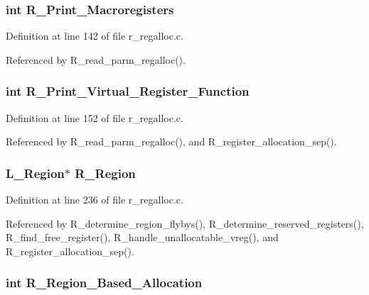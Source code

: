 \subsubsection{\setlength{\rightskip}{0pt plus 5cm}int \bf{R\_\-Print\_\-Macroregisters}}\label{r__regalloc_8h_e5a9cb5c06f2fc4697e6af7cf304277c}




Definition at line 142 of file r\_\-regalloc.c.

Referenced by R\_\-read\_\-parm\_\-regalloc().
\subsubsection{\setlength{\rightskip}{0pt plus 5cm}int \bf{R\_\-Print\_\-Virtual\_\-Register\_\-Function}}\label{r__regalloc_8h_9ae8198dd0b4a1782a84ca9b533a1b66}




Definition at line 152 of file r\_\-regalloc.c.

Referenced by R\_\-read\_\-parm\_\-regalloc(), and R\_\-register\_\-allocation\_\-sep().
\subsubsection{\setlength{\rightskip}{0pt plus 5cm}L\_\-Region$\ast$ \bf{R\_\-Region}}\label{r__regalloc_8h_8dcb42f5ea3c18a0cd300b269c24235a}




Definition at line 236 of file r\_\-regalloc.c.

Referenced by R\_\-determine\_\-region\_\-flybys(), R\_\-determine\_\-reserved\_\-registers(), R\_\-find\_\-free\_\-register(), R\_\-handle\_\-unallocatable\_\-vreg(), and R\_\-register\_\-allocation\_\-sep().
\subsubsection{\setlength{\rightskip}{0pt plus 5cm}int \bf{R\_\-Region\_\-Based\_\-Allocation}}\label{r__regalloc_8h_0730ca7568a827089b1d7aeaf18064d1}




